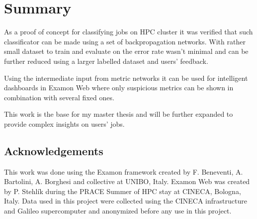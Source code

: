 \documentclass[11pt,a4paper]{article}
\begin{document}
\section{Summary}
\label{sec:sum}

As a proof of concept for classifying jobs on HPC cluster it was verified that such classificator can be made using a set of backpropagation networks. With rather small dataset to train and evaluate on the error rate wasn't minimal and can be further reduced using a larger labelled dataset and users' feedback.

Using the intermediate input from metric networks it can be used for intelligent dashboards in Examon Web where only suspicious metrics can be shown in combination with several fixed ones.

This work is the base for my master thesis and will be further expanded to provide complex insights on users' jobs.

\subsection*{Acknowledgements}
This work was done using the Examon framework created by F. Beneventi, A. Bartolini, A. Borghesi and collective at UNIBO, Italy. Examon Web was created by P. Stehlík during the PRACE Summer of HPC stay at CINECA, Bologna, Italy. Data used in this project were collected using the CINECA infrastructure and Galileo supercomputer and anonymized before any use in this project.

{}

\end{document}

